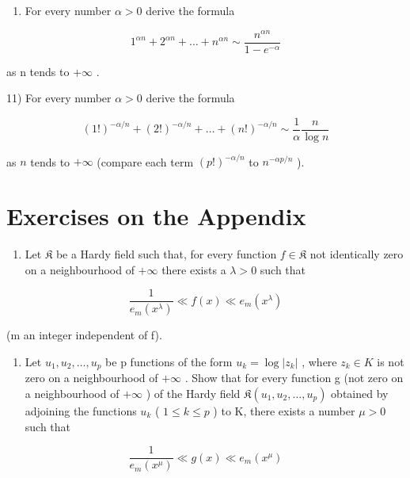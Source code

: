 \begin{enumerate}
\def\labelenumi{\arabic{enumi})}
\setcounter{enumi}{9}
\tightlist
\item
  For every number \(\alpha > 0\) derive the formula
\end{enumerate}

\[
1 ^ {\alpha n} + 2 ^ {\alpha n} + \dots + n ^ {\alpha n} \sim \frac {n ^ {\alpha n}}{1 - e ^ {- \alpha}}
\]

as n tends to \(+\infty\) .

11) For every number \(\alpha > 0\) derive the formula

\[
(1!) ^ {- \alpha / n} + (2!) ^ {- \alpha / n} + \dots + (n!) ^ {- \alpha / n} \sim \frac {1}{\alpha} \frac {n}{\log n}
\]

as \(n\) tends to \(+\infty\) (compare each term \((p!)^{-\alpha / n}\) to \(n^{-\alpha p / n}\) ).

\section*{Exercises on the Appendix}
{}

\begin{enumerate}
\def\labelenumi{\arabic{enumi})}
\tightlist
\item
  Let \(\mathfrak{K}\) be a Hardy field such that, for every function \(f\in \mathfrak{K}\) not identically zero on a neighbourhood of \(+\infty\) there exists a \(\lambda >0\) such that
\end{enumerate}

\[
\frac {1}{e _ {m} (x ^ {\lambda})} \ll f (x) \ll e _ {m} (x ^ {\lambda})
\]

(m an integer independent of f).

\begin{enumerate}
\def\labelenumi{\alph{enumi})}
\tightlist
\item
  Let \(u_{1}, u_{2}, \ldots, u_{p}\) be p functions of the form \(u_{k} = \log |z_{k}|\) , where \(z_{k} \in K\) is not zero on a neighbourhood of \(+\infty\) . Show that for every function g (not zero on a neighbourhood of \(+\infty\) ) of the Hardy field \(\mathfrak{K}(u_{1}, u_{2}, \ldots, u_{p})\) obtained by adjoining the functions \(u_{k}\) ( \(1 \leqslant k \leqslant p\) ) to K, there exists a number \(\mu > 0\) such that
\end{enumerate}

\[
\frac {1}{e _ {m} (x ^ {\mu})} \ll g (x) \ll e _ {m} (x ^ {\mu})
\]


